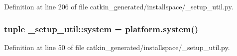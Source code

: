 \-Definition at line 206 of file catkin\-\_\-generated/installspace/\-\_\-setup\-\_\-util.\-py.

\subsubsection[{system}]{\setlength{\rightskip}{0pt plus 5cm}tuple {\bf \-\_\-setup\-\_\-util\-::system} = platform.\-system()}\label{namespace__setup__util_a5883fa688e2e824754a412ffc772863e}


\-Definition at line 50 of file catkin\-\_\-generated/installspace/\-\_\-setup\-\_\-util.\-py.


